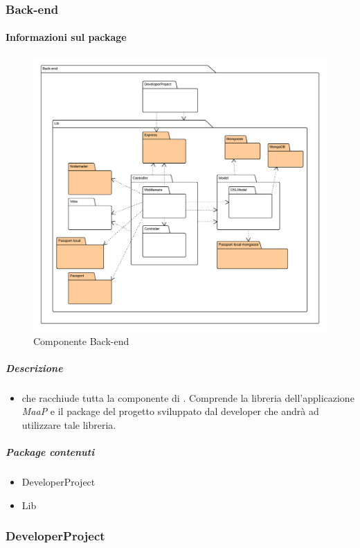 
  \subsubsection{Back-end}
  \paragraph{Informazioni sul package} 
    \begin{figure}[H] 
      \begin{center} 
        \includegraphics[width=\textwidth]{uml/package/Back-end.png}  
        \caption{Componente Back-end}
      \end{center}  
    \end{figure} 
  \subparagraph{Descrizione} 
    \begin{itemize}
    \item[]  che racchiude tutta la componente di . Comprende la libreria dell'applicazione \textit{MaaP} e il package del progetto sviluppato dal developer che andrà ad utilizzare tale libreria.
    \end{itemize} 
    \subparagraph{Package contenuti} 
    \begin{itemize}
        \item DeveloperProject
        \item Lib
    \end{itemize}
  \subsubsection{DeveloperProject}
